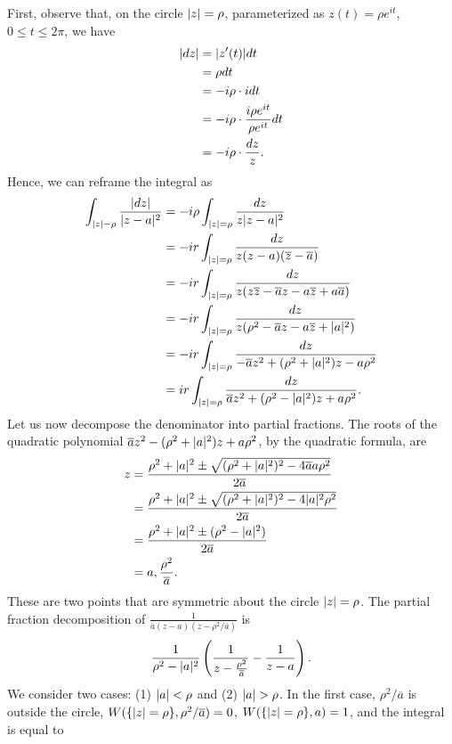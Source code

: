 \begin{exercise}
\begin{sol}
\begin{enumerate}
First, observe that, on the circle $\lvert z \rvert=\rho$, parameterized as $z(t)=\rho e^{it}$, $0 \le t \le 2\pi$, we have
\begin{align*}
\lvert dz \rvert &=\lvert z'(t) \rvert dt \\
&=\rho dt \\
&=-i\rho \cdot i dt \\
&=-i \rho \cdot \dfrac{i \rho e^{it}}{\rho e^{it}}dt \\
&=-i \rho \cdot \dfrac{dz}{z}.
\end{align*}
Hence, we can reframe the integral as \begin{align*}
\int_{\lvert z \rvert-\rho}\dfrac{\lvert dz \rvert}{\lvert z-a \rvert^2} &= -i \rho\int_{\lvert z \rvert=\rho}\dfrac{dz}{z\lvert z-a \rvert^2} \\
&=-ir \int_{\lvert z \rvert=\rho}\dfrac{dz}{z(z-a)(\overline{z}-\overline{a})} \\
&=-ir \int_{\lvert z \rvert=\rho}\dfrac{dz}{z(z\overline{z}-\overline{a}z-a\overline{z}+a\overline{a})} \\
&=-ir \int_{\lvert z \rvert=\rho}\dfrac{dz}{z(\rho^2-\overline{a}z-a\overline{z}+\lvert a \rvert^2)} \\
&=-ir \int_{\lvert z \rvert=\rho}\dfrac{dz}{-\overline{a}z^2+(\rho^2+\lvert a \rvert^2)z-a\rho^2} \\
&=ir \int_{\lvert z \rvert=\rho}\dfrac{dz}{\overline{a}z^2+(\rho^2-\lvert a \rvert^2)z+a\rho^2}.
\end{align*}
Let us now decompose the denominator into partial fractions. The roots of the quadratic polynomial $\overline{a}z^2-(\rho^2+\lvert a \rvert^2)z+a\rho^2$, by the quadratic formula, are
\begin{align*}
z &=\dfrac{\rho^2+\lvert a \rvert^2 \pm \sqrt{(\rho^2+\lvert a \rvert^2)^2-4\overline{a}a\rho^2}}{2\overline{a}} \\
&=\dfrac{\rho^2+\lvert a \rvert^2 \pm \sqrt{(\rho^2+\lvert a \rvert^2)^2-4\lvert a \rvert^2\rho^2}}{2\overline{a}} \\
&=\dfrac{\rho^2+\lvert a \rvert^2 \pm (\rho^2-\lvert a \rvert^2)}{2\overline{a}} \\
&=a, \dfrac{\rho^2}{\overline{a}}.
\end{align*}
These are two points that are symmetric about the circle $\lvert z \rvert=\rho$. The partial fraction decomposition of $\frac{1}{\overline{a}\left(z-a\right)\left(z-\rho^2/\overline{a}\right)}$ is $$\dfrac{1}{\rho^2-\lvert a \rvert^2}\left(\dfrac{1}{z-\frac{\rho^2}{\overline{a}}}-\dfrac{1}{z-a}\right).$$ We consider two cases: (1) $\lvert a \rvert<\rho$ and (2) $\lvert a \rvert>\rho$. In the first case, $\rho^2/\overline{a}$ is outside the circle, $W(\{\lvert z \rvert=\rho\},\rho^2/\overline{a})=0$, $W(\{\lvert z \rvert=\rho\},a)=1$, and the integral is equal to

\end{enumerate}
\end{sol}
\end{exercise}
